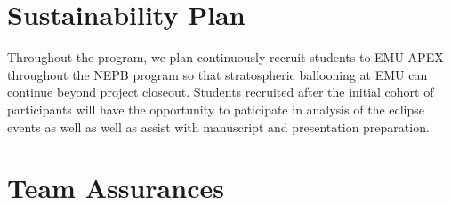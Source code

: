 \documentclass[12pt]{article}
\begin{document}
\section{Sustainability Plan}

Throughout the program, we plan continuously recruit students to EMU APEX throughout
 the NEPB program
so that stratospheric ballooning at EMU can continue beyond project closeout. Students recruited after
the initial cohort of participants will have the opportunity to paticipate in
analysis of the eclipse events as well as well as assist with manuscript and presentation
preparation.


\section{Team Assurances}
\end{document}
